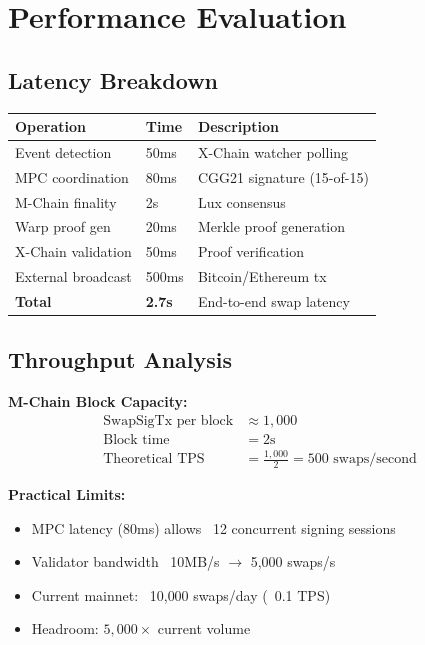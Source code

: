 \section{Performance Evaluation}


\subsection{Latency Breakdown}

\begin{table}[h]
\centering
\begin{tabular}{@{}lll@{}}
\toprule
\textbf{Operation} & \textbf{Time} & \textbf{Description} \\
\midrule
Event detection & 50ms & X-Chain watcher polling \\
MPC coordination & 80ms & CGG21 signature (15-of-15) \\
M-Chain finality & 2s & Lux consensus \\
Warp proof gen & 20ms & Merkle proof generation \\
X-Chain validation & 50ms & Proof verification \\
External broadcast & 500ms & Bitcoin/Ethereum tx \\
\midrule
\textbf{Total} & \textbf{2.7s} & End-to-end swap latency \\
\bottomrule
\end{tabular}

\label{tab:latency}
\end{table}

\subsection{Throughput Analysis}

\textbf{M-Chain Block Capacity:}
\begin{align}
\text{SwapSigTx per block} &\approx 1{,}000 \\
\text{Block time} &= 2\text{s} \\
\text{Theoretical TPS} &= \frac{1{,}000}{2} = 500 \text{ swaps/second}
\end{align}

\textbf{Practical Limits:}
\begin{itemize}
\item MPC latency (80ms) allows ~12 concurrent signing sessions
\item Validator bandwidth ~10MB/s $\to$ 5{,}000 swaps/s
\item Current mainnet: ~10{,}000 swaps/day (~0.1 TPS)
\item Headroom: $5{,}000\times$ current volume
\end{itemize}

